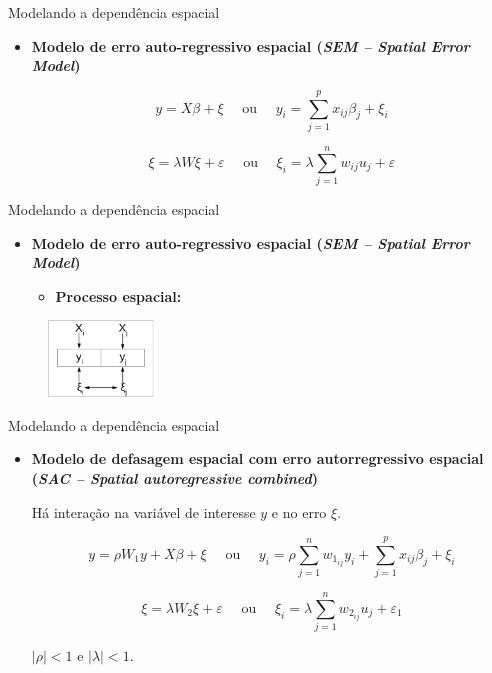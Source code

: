\documentclass[aspectratio=169]{beamer}
\begin{document}
\begin{frame}{Modelando a dependência espacial}
    \begin{itemize}
        \item \textbf{Modelo de erro auto-regressivo espacial (\textit{SEM -- Spatial Error Model})}
        \vspace{0.5cm}
        \begin{block}{}
            $$y = X\beta+ \xi \quad \text{ ou }\quad  y_i = \sum_{j=1}^{p} x_{ij}\beta_j + \xi_i$$  
            
            $$\xi = \lambda W \xi + \varepsilon \quad \text{ ou }\quad  \xi_i = \lambda \sum_{j=1}^{n} w_{ij} u_j + \varepsilon$$
        \end{block}
    \end{itemize}
\end{frame}

\begin{frame}{Modelando a dependência espacial}
    \begin{itemize}
        \item \textbf{Modelo de erro auto-regressivo espacial (\textit{SEM -- Spatial Error Model})}
        \vspace{0.5cm}
        \noindent 
        \begin{itemize}
            \item \textbf{Processo espacial:}
        \end{itemize}
    \end{itemize}
    \begin{figure}
		\centering
		\includegraphics[width=0.25\textwidth]{img/reg_sem.png}
	\end{figure}
\end{frame}

\begin{frame}{Modelando a dependência espacial}
    \begin{itemize}
        \item \textbf{Modelo de defasagem espacial com erro autorregressivo espacial (\textit{SAC -- Spatial autoregressive combined})}
        
        \vspace{0.2cm}
        Há interação na variável de interesse $y$ e no erro $\xi$.
        \begin{block}{}
            $$y = \rho W_1y +  X\beta+ \xi \quad \text{ ou }\quad y_i = \rho \sum_{j=1}^{n} w_{1_{ij}} y_i + \sum_{j=1}^{p} x_{ij}\beta_j + \xi_i$$  
            
            $$\xi = \lambda W_2 \xi + \varepsilon \quad \text{ ou }\quad \xi_i = \lambda  \sum_{j=1}^{n} w_{2_{ij}} u_j + \varepsilon_1$$
        \end{block}
        \noindent $|\rho|<1$ e $|\lambda|<1$. 
    \end{itemize}
\end{frame}
\end{document}
